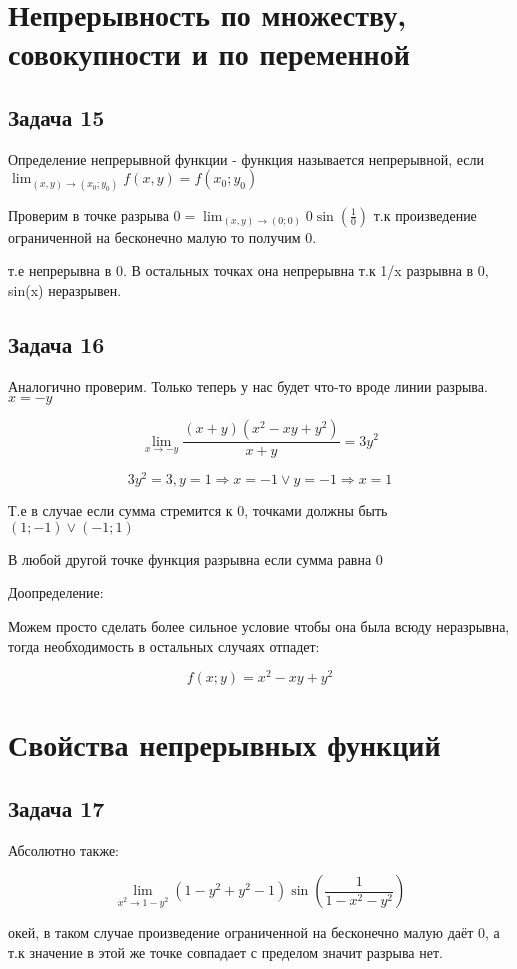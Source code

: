 \documentclass[a4paper,12pt]{article}
\begin{document}
\section{Непрерывность по множеству, совокупности и по переменной}

\subsection{Задача 15}
Определение непрерывной функции - функция называется непрерывной, если $\lim_{(x,y) \to (x_0;y_0)}f(x, y)=f(x_0;y_0)$

Проверим в точке разрыва $0=\lim_{(x,y) \to (0;0)} 0\sin(\frac{1}{0})$ т.к произведение ограниченной на бесконечно малую то получим 0.  

т.е непрерывна в 0. В остальных точках она непрерывна т.к 1/x разрывна в 0, sin(x) неразрывен.

\subsection{Задача 16}
Аналогично проверим. Только теперь у нас будет что-то вроде линии разрыва. $x=-y$

\[
\lim_{x \to -y} \frac{(x+y)(x^2-xy+y^2)}{x+y} = 3y^2 
\]

\[
3y^2=3, y=1 \Rightarrow x =-1 \lor y=-1 \Rightarrow x=1
\]

Т.е в случае если сумма стремится к 0, точками должны быть $(1;-1) \lor (-1;1)$

В любой другой точке функция разрывна если сумма равна 0

Доопределение: 

Можем просто сделать более сильное условие чтобы она была всюду неразрывна, тогда необходимость в остальных случаях отпадет: 

\[
f(x;y) = x^2-xy+y^2
\]

\section{Свойства непрерывных функций}

\subsection{Задача 17}
Абсолютно также:

\[
\lim_{x^2 \to 1-y^2} (1-y^2+y^2-1)\sin(\frac{1}{1-x^2-y^2})
\]

окей, в таком случае произведение ограниченной на бесконечно малую даёт 0, а т.к значение в этой же точке совпадает с пределом значит разрыва нет.
\end{document}
